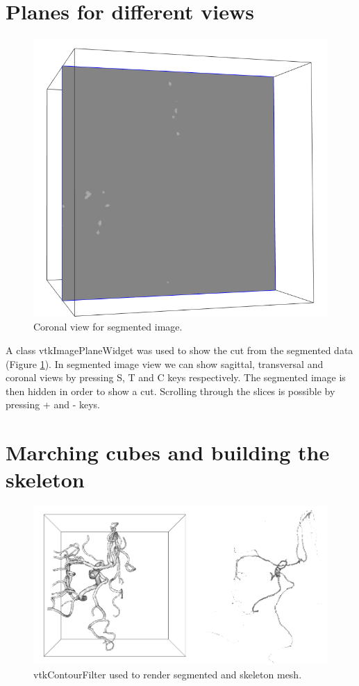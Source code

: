 \section{Planes for different views}

\begin{figure}
	\centering
	\includegraphics[scale=0.3]{fig/image-plane}
	\caption{Coronal view for segmented image.}\label{fig:image-plane}
\end{figure}

A class vtkImagePlaneWidget was used to show the cut from the segmented data (Figure \ref{fig:image-plane}). In segmented image view we can show sagittal, transversal and coronal views by pressing S, T and C keys respectively. The segmented image is then hidden in order to show a cut. Scrolling through the slices is possible by pressing + and - keys.

\section{Marching cubes and building the skeleton}

\begin{figure}
	\centering
	\includegraphics[scale=0.6]{fig/segmented-skeleton}
	\caption{vtkContourFilter used to render segmented and skeleton mesh.}\label{fig:segmented-skeleton}
\end{figure}

